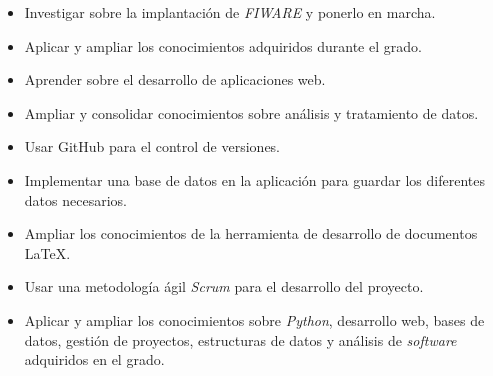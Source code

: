 \begin{itemize}
\tightlist

\item Investigar sobre la implantación de \textit{FIWARE} y ponerlo en marcha.
\item Aplicar y ampliar los conocimientos adquiridos durante el grado.
\item Aprender sobre el desarrollo de aplicaciones web.
\item Ampliar y consolidar conocimientos sobre análisis y tratamiento de datos.
\item Usar GitHub para el control de versiones.
\item Implementar una base de datos en la aplicación para guardar los diferentes datos necesarios.
\item Ampliar los conocimientos de la herramienta de desarrollo de documentos \LaTeX{}.
\item Usar una metodología ágil \textit{Scrum} para el desarrollo del proyecto.
\item Aplicar y ampliar los conocimientos sobre \textit{Python}, desarrollo web, bases de datos, gestión de proyectos, estructuras de datos y análisis de \textit{software} adquiridos en el grado.


\end{itemize}